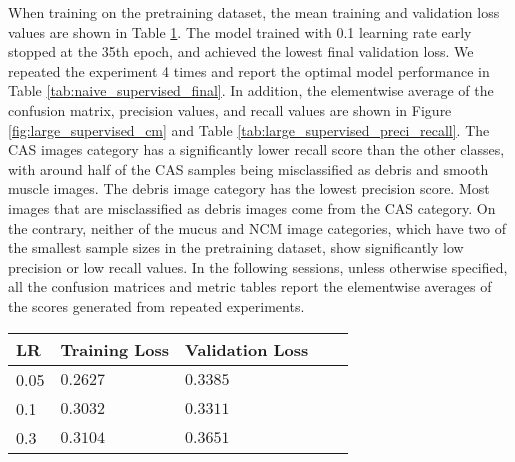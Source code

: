 \documentclass[12pt,twoside]{report}
\begin{document}
When training on the pretraining dataset, the mean training and validation loss values are shown in Table \ref{tab:large_supervised_tuning}. The model trained with 0.1 learning rate early stopped at the 35th epoch, and achieved the lowest final validation loss. We repeated the experiment 4 times and report the optimal model performance in Table \ref{tab:naive_supervised_final}. In addition, the elementwise average of the confusion matrix, precision values, and recall values are shown in Figure \ref{fig:large_supervised_cm} and Table \ref{tab:large_supervised_preci_recall}. The CAS images category has a significantly lower recall score than the other classes, with around half of the CAS samples being misclassified as debris and smooth muscle images. The debris image category has the lowest precision score. Most images that are misclassified as debris images come from the CAS category. On the contrary, neither of the mucus and NCM image categories, which have two of the smallest sample sizes in the pretraining dataset, show significantly low precision or low recall values. In the following sessions, unless otherwise specified, all the confusion matrices and metric tables report the elementwise averages of the scores generated from repeated experiments.\\




\begin{table}[]
    \centering
    \begin{tabular}{lllll}
    \toprule
    LR & Training Loss & Validation Loss \\
    \midrule
    0.05 & $0.2627$ & $0.3385$\\
    0.1 & $0.3032$ & $0.3311$\\
    0.3 & $0.3104$ & $0.3651$\\
    \bottomrule
    \end{tabular}
    \captionsetup{type=table}
    \label{tab:large_supervised_tuning}
\end{table}
\end{document}
